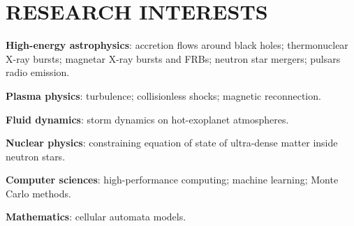 \documentclass[letterpaper, onecolumn, 11pt]{article}
\begin{document}
\vspace{-0.3cm}
\section*{RESEARCH INTERESTS}
\vspace{-0.3cm}
\noindent \textbf{High-energy astrophysics}:
accretion flows around black holes; %
thermonuclear X-ray bursts; %
magnetar X-ray bursts and FRBs; %
neutron star mergers; %
pulsars radio emission. %

\noindent \textbf{Plasma physics}: 
turbulence; %
collisionless shocks;
magnetic reconnection.

\noindent \textbf{Fluid dynamics}: 
storm dynamics on hot-exoplanet atmospheres.

\noindent \textbf{Nuclear physics}: 
constraining equation of state of ultra-dense matter inside neutron stars.

\noindent \textbf{Computer sciences}: 
high-performance computing; machine learning; Monte Carlo methods.

\noindent \textbf{Mathematics}: 
cellular automata models.


\end{document}

